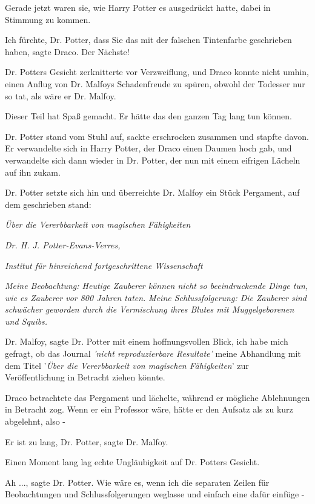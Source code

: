 Gerade jetzt waren sie, wie Harry Potter es ausgedrückt hatte, dabei in Stimmung
zu kommen.

\glqq{}Ich fürchte, Dr. Potter, dass Sie das mit der falschen Tintenfarbe
geschrieben haben\grqq{}, sagte Draco. \glqq{}Der Nächste!\grqq{}

Dr. Potters Gesicht zerknitterte vor Verzweiflung, und Draco konnte nicht umhin,
einen Anflug von Dr. Malfoys Schadenfreude zu spüren, obwohl der Todesser nur so
tat, als wäre er Dr. Malfoy.

Dieser Teil hat Spaß gemacht. Er hätte das den ganzen Tag lang tun können.

Dr. Potter stand vom Stuhl auf, sackte erschrocken zusammen und stapfte davon.
Er verwandelte sich in Harry Potter, der Draco einen Daumen hoch gab, und
verwandelte sich dann wieder in Dr. Potter, der nun mit einem eifrigen Lächeln
auf ihn zukam.

Dr. Potter setzte sich hin und überreichte Dr. Malfoy ein Stück Pergament, auf
dem geschrieben stand:

\begin{center}
\emph{Über die Vererbbarkeit von magischen Fähigkeiten}

\emph{Dr. H. J. Potter-Evans-Verres,}

\emph{Institut für hinreichend fortgeschrittene Wissenschaft}

\emph{Meine Beobachtung: Heutige Zauberer können nicht so beeindruckende Dinge
tun, wie es Zauberer vor 800 Jahren taten.} \emph{Meine Schlussfolgerung: Die
Zauberer sind schwächer geworden durch die Vermischung ihres Blutes mit
Muggelgeborenen und Squibs.}

\glqq{}Dr. Malfoy\grqq{}, sagte Dr. Potter mit einem hoffnungsvollen Blick,
\glqq{} ich habe mich gefragt, ob das Journal \emph{'nicht reproduzierbare
Resultate'} meine Abhandlung mit dem Titel '\emph{Über die Vererbbarkeit von
magischen Fähigkeiten}' zur Veröffentlichung in Betracht ziehen könnte.\grqq{}
\end{center}

Draco betrachtete das Pergament und lächelte, während er mögliche Ablehnungen in
Betracht zog. Wenn er ein Professor wäre, hätte er den Aufsatz als zu kurz
abgelehnt, also -

\glqq{}Er ist zu lang, Dr. Potter\grqq{}, sagte Dr. Malfoy.

Einen Moment lang lag echte Ungläubigkeit auf Dr. Potters Gesicht.

\glqq{}Ah ...\grqq{}, sagte Dr. Potter. \glqq{}Wie wäre es, wenn ich die
separaten Zeilen für Beobachtungen und Schlussfolgerungen weglasse und einfach
eine dafür einfüge -\grqq{}

